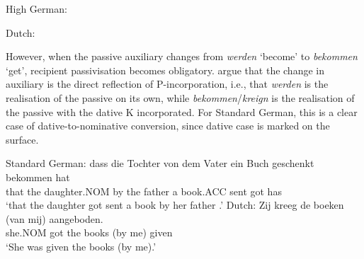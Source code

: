 \begin{exe}
\ex High German:
\begin{xlist}
\end{xlist}
\ex Dutch:
\begin{xlist}
\end{xlist}
\end{exe}


However, when the passive auxiliary changes from \textit{werden} `become' to \textit{bekommen} `get', recipient passivisation becomes obligatory. \cite{Alexiadou.2014} argue that the change in auxiliary is the direct reflection of P-incorporation, i.e., that \textit{werden} is the realisation of the passive on its own, while \textit{bekommen}/\textit{kreign} is the realisation of the passive with the dative K incorporated. For Standard German, this is a clear case of dative-to-nominative conversion, since dative case is marked on the surface.

\begin{exe}
\ex Standard German:
\gll dass die Tochter von dem Vater ein Buch geschenkt bekommen hat\\
that the daughter.NOM by the father a book.ACC sent got has\\
\trans `that the daughter got sent a book by her father \cite[183]{Draye.1996}.'
\ex Dutch:
\gll Zij kreeg de boeken (van mij) aangeboden.\\
she.NOM got the books (by me) given\\
\trans `She was given the books (by me).' \citep[ex. 7]{Broekhuis.1994}
\end{exe}


